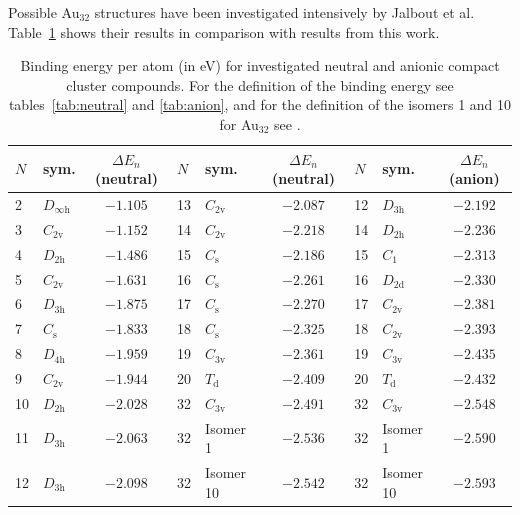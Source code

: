 Possible Au$_{32}$ structures have been investigated intensively by Jalbout et
al.\autocite{Jalbout_LowSymmetryStructuresAu_2008} Table~\ref{tab:Aun} shows
their results in comparison with results from this work.
%
\begin{table}[htbp]
	\centering
    \setlength{\tabcolsep}{3pt}
    \footnotesize{
    \caption{Binding energy per atom (in eV) for investigated neutral and
    anionic compact cluster compounds. For the definition of the binding energy
    see tables~\ref{tab:neutral} and \ref{tab:anion}, and for the definition of
    the isomers 1 and 10 for Au$_{32}$ see \citeauthor{Jalbout_LowSymmetryStructuresAu_2008}.\autocite{Jalbout_LowSymmetryStructuresAu_2008}}
	\label{tab:Aun}
	\begin{tabular}{llcllcllc}
		\toprule
		$N$  & sym.  & $\Delta E_n$(neutral) & $N$  & sym.  & $\Delta E_n$(neutral) & $N$  & sym.  & $\Delta E_n$(anion) \\
		\midrule
2  & $D_\mathrm{\infty h}$ & $-1.105$ & 13 & $C_\mathrm{2v}$ & $-2.087$ & 12 & $D_\mathrm{3h}$  & $-2.192$ \\
3  & $C_\mathrm{2v}$       & $-1.152$ & 14 & $C_\mathrm{2v}$ & $-2.218$ & 14 & $D_\mathrm{2h}$  & $-2.236$ \\
4  & $D_\mathrm{2h}$       & $-1.486$ & 15 & $C_\mathrm{s}$  & $-2.186$ & 15 & $C_\mathrm{1}$     & $-2.313$ \\
5  & $C_\mathrm{2v}$       & $-1.631$ & 16 & $C_\mathrm{s}$  & $-2.261$ & 16 & $D_\mathrm{2d}$  & $-2.330$ \\
6  & $D_\mathrm{3h}$       & $-1.875$ & 17 & $C_\mathrm{s}$  & $-2.270$ & 17 & $C_\mathrm{2v}$  & $-2.381$ \\
7  & $C_\mathrm{s}$        & $-1.833$ & 18 & $C_\mathrm{s}$  & $-2.325$ & 18 & $C_\mathrm{2v}$  & $-2.393$ \\
8  & $D_\mathrm{4h}$       & $-1.959$ & 19 & $C_\mathrm{3v}$ & $-2.361$ & 19 & $C_\mathrm{3v}$  & $-2.435$ \\
9  & $C_\mathrm{2v}$       & $-1.944$ & 20 & $T_\mathrm{d}$  & $-2.409$ & 20 & $T_\mathrm{d}$     & $-2.432$ \\
10 & $D_\mathrm{2h}$       & $-2.028$ & 32 & $C_\mathrm{3v}$ & $-2.491$ & 32 & $C_\mathrm{3v}$  & $-2.548$ \\
11 & $D_\mathrm{3h}$       & $-2.063$ & 32 & Isomer 1        & $-2.536$ & 32 & Isomer 1  & $-2.590$ \\
12 & $D_\mathrm{3h}$       & $-2.098$ & 32 & Isomer 10       & $-2.542$ & 32 & Isomer 10 & $-2.593$ \\
		\bottomrule
    \end{tabular}}
\end{table}

